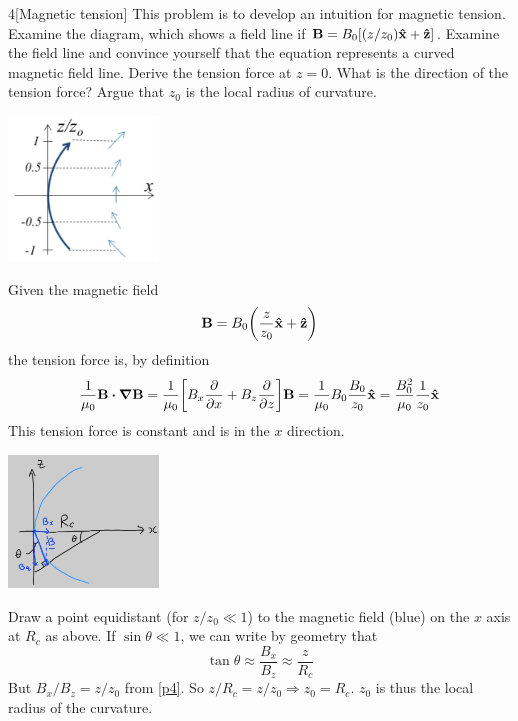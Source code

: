 \documentclass[12pt]{article}
\begin{document}
\begin{problem}{4}[Magnetic tension]
This problem is to develop an intuition for magnetic tension. Examine the
diagram, which shows a field line if $\vb{B}=B_0[(z /z_0)\vb{\hat{x}}+\vb{\hat{z}}]$. Examine
the field line and convince yourself that the equation represents a curved
magnetic field line. Derive the tension force at $z=0$. What is the direction of
the tension force? Argue that $z_0$ is the local radius of curvature.
\begin{center}
    \includegraphics[width=0.3\textwidth]{hw3_p4.jpg} 
\end{center}
\begin{solution}
Given the magnetic field
\begin{equation}\label{p4}
    \vb{B}=B_0\qty(\frac{z}{z_0}\vb{\hat{x}}+\vb{\hat{z}}) 
\end{equation}
the tension force is, by definition
\begin{align}
    \frac1{\mu_0}\vb{B}\vdot\grad\vb{B}
    =\frac1{\mu_0}\qty[B_x\frac{\partial}{\partial
    x}+B_z\frac{\partial}{\partial z}]\vb{B}
    =\frac1{\mu_0}B_0\frac{B_0}{z_0}\xhat
    =\frac{B_0^2}{\mu_0}\frac1{z_0}\xhat
\end{align}
This tension force is constant and is in the $x$ direction.
\begin{center}
    \includegraphics[width=0.3\textwidth]{hw3_p4b.jpg} 
\end{center}
Draw a point equidistant (for $z /z_0\ll 1$) to the magnetic field (blue) on the
$x$ axis at $R_c$ as above. If $\sin\theta\ll 1$, we can write by geometry that
\begin{equation}
    \tan\theta\approx\frac{B_x}{B_z}\approx\frac{z}{R_c} 
\end{equation}
But $B_x /B_z=z /z_0$ from \eqref{p4}. So $z /R_c=z /z_0\Rightarrow z_0=R_c$.
$z_0$ is thus the local radius of the curvature.
\end{solution}
\end{problem}
\end{document}
